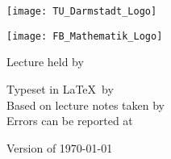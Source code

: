 \makeatletter
\begin{titlepage}
\recalctypearea
\centering

	\texttt{[image: TU\_Darmstadt\_Logo]}

\vspace{1cm}

	\texttt{[image: FB\_Mathematik\_Logo]}

\vspace{3.5cm}

	{\Huge{} \@title}

\vspace{0.5cm}

	{ \@subtitle}

\vspace{0.5cm}

	{ Lecture held by \@lecturer}

\vspace{1.0cm}

	\begingroup
	\small
	Typeset in \LaTeX\ by \@setter\\
	Based on lecture notes taken by \@notetaker\\
	Errors can be reported at \mailto{\@email}
	\endgroup

\vfill

	{\small Version of \today}
\end{titlepage}
\makeatother
